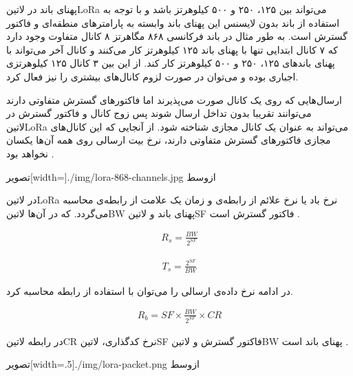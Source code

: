 پهنای باند در ‌لاتین{LoRa} می‌تواند بین ۱۲۵، ۲۵۰ و ۵۰۰ کیلوهرتز باشد و با توجه به استفاده از باند بدون لایسنس این پهنای باند وابسته به پارامتر‌های منطقه‌ای و فاکتور گسترش است.
به طور مثال در باند فرکانسی ۸۶۸ مگاهرتز ۸ کانال متفاوت وجود دارد که ۷ کانال ابتدایی تنها با پهنای باند ۱۲۵ کیلوهرتز کار می‌کنند و کانال آخر می‌تواند با پهنای باند‌های
۱۲۵، ۲۵۰ و ۵۰۰ کیلوهرتز کار کند. از این بین ۳ کانال ۱۲۵ کیلوهرتزی اجباری بوده و می‌توان در صورت لزوم کانال‌های بیشتری را نیز فعال کرد.

ارسال‌هایی که روی یک کانال صورت می‌پذیرند اما فاکتورهای گسترش متفاوتی دارند می‌توانند تقریبا بدون تداخل ارسال شوند پس زوج کانال و فاکتور گسترش در ‌لاتین{LoRa} می‌تواند به عنوان
یک کانال مجازی شناخته شود. از آنجایی که این کانال‌های مجازی فاکتورهای گسترش متفاوتی دارند، نرخ بیت ارسالی روی همه آن‌ها یکسان نخواهد بود
.

‌تصویر[width=\textwidth]{./img/lora-868-channels.jpg}
‌ازوسط

در ‌لاتین{LoRa} نرخ باد یا نرخ علائم از رابطه‌ی 
و زمان یک علامت از رابطه‌ی 
محاسبه می‌گردد.
که در آن‌ها ‌لاتین{BW} پهنای باند و ‌لاتین{SF} فاکتور گسترش است
.

\begin{align}
  \label{معادله: نرخ باد یا علائم در LoRa}
  R_{s} = \frac{BW}{2^{SF}}
\end{align}

\begin{align}
  \label{معادله: زمان علامت در LoRa}
  T_{s} = \frac{2^{SF}}{BW}
\end{align}

در ادامه نرخ داده‌ی ارسالی را می‌توان با استفاده از رابطه  محاسبه کرد.

\begin{align}
  \label{معادله: نرخ داده در LoRa}
  R_{b} = SF \times \frac{BW}{2^{SF}} \times CR
\end{align}

در رابطه  ‌لاتین{CR} نرخ کدگذاری، ‌لاتین{SF} فاکتور گسترش و ‌لاتین{BW} پهنای باند است
.

‌تصویر[width=.5\textwidth]{./img/lora-packet.png}
‌ازوسط

